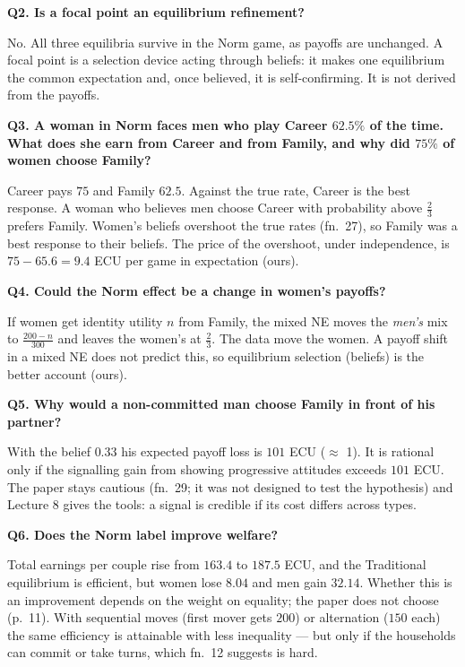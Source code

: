 \documentclass[11pt,a4paper]{article}
\newcommand{\answer}[1]{\begin{tcolorbox}[colback=ans!5,colframe=ans,boxrule=0.6pt,
  left=5pt,right=5pt,top=3pt,bottom=3pt]#1\end{tcolorbox}}
\begin{document}
\textbf{Q2. Is a focal point an equilibrium refinement?}
\answer{No. All three equilibria survive in the Norm game, as payoffs are unchanged. A focal point is
a selection device acting through beliefs: it makes one equilibrium the common expectation and,
once believed, it is self-confirming. It is not derived from the payoffs.}

\textbf{Q3. A woman in Norm faces men who play Career $62.5\%$ of the time. What does she earn from
Career and from Family, and why did $75\%$ of women choose Family?}
\answer{Career pays $75$ and Family $62.5$. Against the true rate, Career is the best response. A woman
who believes men choose Career with probability above $\tfrac23$ prefers Family. Women's beliefs
overshoot the true rates (fn.~27), so Family was a best response to their beliefs. The price of the
overshoot, under independence, is $75-65.6=9.4$ ECU per game in expectation (ours).}

\textbf{Q4. Could the Norm effect be a change in women's payoffs?}
\answer{If women get identity utility $n$ from Family, the mixed NE moves the \emph{men's} mix to
$\tfrac{200-n}{300}$ and leaves the women's at $\tfrac23$. The data move the women. A payoff shift in
a mixed NE does not predict this, so equilibrium selection (beliefs) is the better account (ours).}

\textbf{Q5. Why would a non-committed man choose Family in front of his partner?}
\answer{With the belief $0.33$ his expected payoff loss is $101$ ECU ($\approx$ \texteuro{}1). It is rational only
if the signalling gain from showing progressive attitudes exceeds $101$ ECU. The paper stays
cautious (fn.~29; it was not designed to test the hypothesis) and Lecture 8 gives the tools: a
signal is credible if its cost differs across types.}

\textbf{Q6. Does the Norm label improve welfare?}
\answer{Total earnings per couple rise from $163.4$ to $187.5$ ECU, and the Traditional equilibrium is
efficient, but women lose $8.04$ and men gain $32.14$. Whether this is an improvement depends on the
weight on equality; the paper does not choose (p.~11). With sequential moves (first mover gets
$200$) or alternation ($150$ each) the same efficiency is attainable with less inequality ---
but only if the households can commit or take turns, which fn.~12 suggests is hard.}
\end{document}
